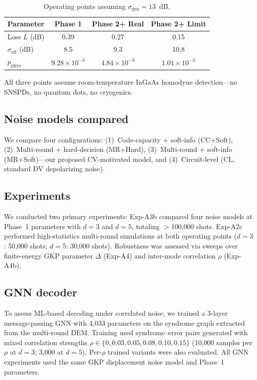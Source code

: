 \documentclass[twocolumn,showpacs,preprintnumbers,amsmath,amssymb,superscriptaddress]{revtex4-2}
\begin{document}
\begin{table}[h]
\caption{Operating points assuming $\sigma_{\mathrm{gen}} = 13$~dB.}
\label{tab:operating}
\begin{ruledtabular}
\begin{tabular}{lccc}
Parameter & Phase 1 & Phase 2+ Real & Phase 2+ Limit \\
\hline
Loss $L$ (dB) & 0.39 & 0.27 & 0.15 \\
$\sigma_{\mathrm{eff}}$ (dB) & 8.5 & 9.3 & 10.8 \\
$p_{\mathrm{phys}}$ & $9.28{\times}10^{-3}$ & $4.84{\times}10^{-3}$ & $1.01{\times}10^{-3}$ \\
\end{tabular}
\end{ruledtabular}
\end{table}

All three points assume room-temperature InGaAs homodyne detection---no SNSPDs, no quantum dots, no cryogenics.

\subsection{Noise models compared}

We compare four configurations: (1)~Code-capacity + soft-info (CC+Soft), (2)~Multi-round + hard-decision (MR+Hard), (3)~Multi-round + soft-info (MR+Soft)---our proposed CV-motivated model, and (4)~Circuit-level (CL, standard DV depolarizing noise).

\subsection{Experiments}

We conducted two primary experiments: Exp-A3b compared four noise models at Phase~1 parameters with $d = 3$ and $d = 5$, totaling $>$100{,}000 shots. Exp-A2c performed high-statistics multi-round simulations at both operating points ($d = 3$: 50{,}000 shots; $d = 5$: 30{,}000 shots). Robustness was assessed via sweeps over finite-energy GKP parameter $\Delta$ (Exp-A4) and inter-mode correlation $\rho$ (Exp-A4b).

\subsection{GNN decoder}

To assess ML-based decoding under correlated noise, we trained a 3-layer message-passing GNN with 4{,}033 parameters on the syndrome graph extracted from the multi-round DEM. Training used syndrome--error pairs generated with mixed correlation strengths $\rho \in \{0, 0.03, 0.05, 0.08, 0.10, 0.15\}$ (10{,}000 samples per $\rho$ at $d = 3$; 3{,}000 at $d = 5$). Per-$\rho$ trained variants were also evaluated. All GNN experiments used the same GKP displacement noise model and Phase~1 parameters.
\end{document}

